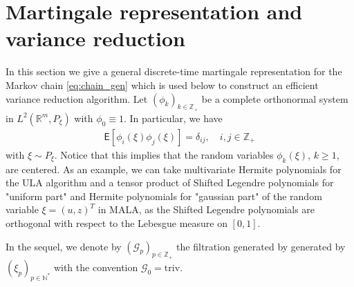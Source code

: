 \documentclass[preprint]{imsart}
\begin{document}
\section{Martingale representation and variance reduction}
\label{seq:mart_repr}
In this section we give a general discrete-time martingale representation for the Markov chain \eqref{eq:chain_gen} which is  used below to construct an efficient variance reduction algorithm. Let \((\phi_k)_{k\in \mathbb{Z}_+}\) be a complete orthonormal system in \(L^2(\mathbb{R}^m, P_{\xi})\) with \(\phi_0\equiv 1\).  In particular, we have
\begin{eqnarray*}
\mathsf{E}[\phi_i(\xi)\phi_j(\xi)]=\delta_{ij},\quad i,j\in  \mathbb{Z}_{+}
\end{eqnarray*}
with \(\xi \sim P_{\xi}.\)
Notice that this implies that the random variables
$\phi_k(\xi)$, $k\ge1$, are centered. As an example, we can take  multivariate Hermite polynomials for the ULA algorithm and a tensor product of Shifted Legendre polynomials for "uniform part" and Hermite polynomials for "gaussian part"  of the random variable $\xi = (u, z)^T$ in MALA, as the Shifted Legendre polynomials are orthogonal with respect to the Lebesgue measure on \([0,1].\) 

In the sequel, we denote by $(\mathcal{G}_p)_{p\in \mathbb{Z}_+}$  the filtration
generated by generated by $(\xi_p)_{p \in \mathbb{N}^*}$ with the convention $\mathcal{G}_0=\mathrm{triv}$.
\end{document}
